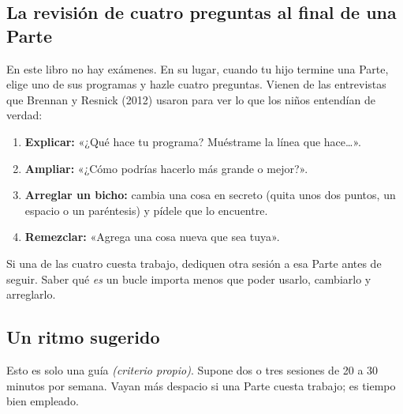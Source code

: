 \subsection*{La revisión de cuatro preguntas al final de una Parte}

En este libro no hay exámenes. En su lugar, cuando tu hijo termine una Parte, elige uno de sus programas y hazle cuatro preguntas. Vienen de las entrevistas que Brennan y Resnick (2012) usaron para ver lo que los niños entendían de verdad:

\begin{tcolorbox}[enhanced, colback=myblocks!10, colframe=myblocks!80!black, arc=6pt, boxrule=0.8pt, left=8pt]
\begin{enumerate}[leftmargin=*]
  \item \textbf{Explicar:} «¿Qué hace tu programa? Muéstrame la línea que hace\ldots».
  \item \textbf{Ampliar:} «¿Cómo podrías hacerlo más grande o mejor?».
  \item \textbf{Arreglar un bicho:} cambia una cosa en secreto (quita unos dos puntos, un espacio o un paréntesis) y pídele que lo encuentre.
  \item \textbf{Remezclar:} «Agrega una cosa nueva que sea tuya».
\end{enumerate}
\end{tcolorbox}

Si una de las cuatro cuesta trabajo, dediquen otra sesión a esa Parte antes de seguir. Saber qué \emph{es} un bucle importa menos que poder usarlo, cambiarlo y arreglarlo.

\subsection*{Un ritmo sugerido}

Esto es solo una guía \textit{(criterio propio)}. Supone dos o tres sesiones de 20 a 30 minutos por semana. Vayan más despacio si una Parte cuesta trabajo; es tiempo bien empleado.

